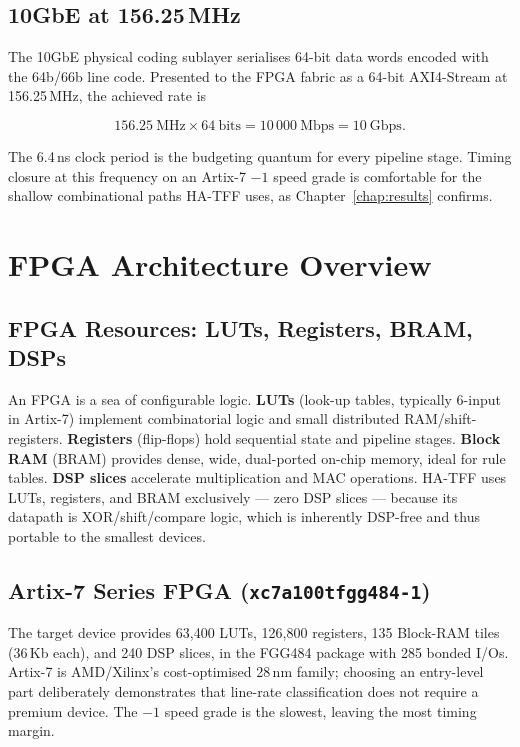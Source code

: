 \documentclass[12pt,twoside,openright]{book}
\begin{document}
\subsection{10GbE at 156.25\,MHz}

The 10GbE physical coding sublayer serialises 64-bit data words encoded with the 64b/66b line
code. Presented to the FPGA fabric as a 64-bit AXI4-Stream at 156.25\,MHz, the achieved rate is

\begin{equation}
156.25\ \text{MHz} \times 64\ \text{bits} = 10\,000\ \text{Mbps} = 10\ \text{Gbps}.
\label{eq:10g}
\end{equation}

\noindent The 6.4\,ns clock period is the budgeting quantum for every pipeline stage. Timing closure
at this frequency on an Artix-7 $-1$ speed grade is comfortable for the shallow combinational paths
HA-TFF uses, as Chapter~\ref{chap:results} confirms.

\section{FPGA Architecture Overview}

\subsection{FPGA Resources: LUTs, Registers, BRAM, DSPs}

An FPGA is a sea of configurable logic. \textbf{LUTs} (look-up tables, typically 6-input in
Artix-7) implement combinatorial logic and small distributed RAM/shift-registers. \textbf{Registers}
(flip-flops) hold sequential state and pipeline stages. \textbf{Block RAM} (BRAM) provides dense,
wide, dual-ported on-chip memory, ideal for rule tables. \textbf{DSP slices} accelerate
multiplication and MAC operations. HA-TFF uses LUTs, registers, and BRAM exclusively --- zero DSP
slices --- because its datapath is XOR/shift/compare logic, which is inherently DSP-free and thus
portable to the smallest devices.

\subsection{Artix-7 Series FPGA (\texttt{xc7a100tfgg484-1})}

The target device provides 63{,}400 LUTs, 126{,}800 registers, 135 Block-RAM tiles (36\,Kb each),
and 240 DSP slices, in the FGG484 package with 285 bonded I/Os. Artix-7 is AMD/Xilinx's
cost-optimised 28\,nm family; choosing an entry-level part deliberately demonstrates that line-rate
classification does not require a premium device. The $-1$ speed grade is the slowest, leaving the
most timing margin.
\end{document}
